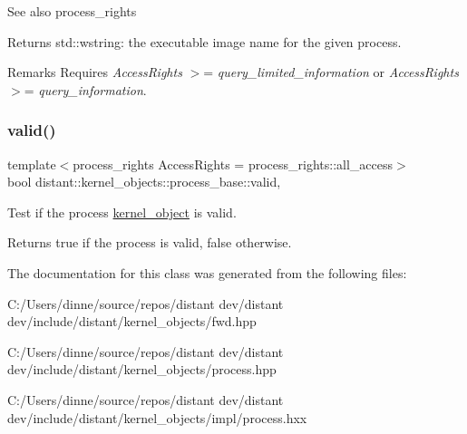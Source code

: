 \begin{DoxySeeAlso}{See also}
process\+\_\+rights 
\end{DoxySeeAlso}
\begin{DoxyReturn}{Returns}
std\+::wstring\+: the executable image name for the given process. 
\end{DoxyReturn}
\begin{DoxyRemark}{Remarks}
Requires {\itshape Access\+Rights} $>$= {\itshape query\+\_\+limited\+\_\+information} or {\itshape Access\+Rights} $>$= {\itshape query\+\_\+information}. 
\end{DoxyRemark}
\mbox{\label{classdistant_1_1kernel__objects_1_1process_a6299b49ad8fb1c22e54dc9aa6c3a09b2}} 
\subsubsection{\texorpdfstring{valid()}{valid()}}
{\footnotesize\ttfamily template$<$process\+\_\+rights Access\+Rights = process\+\_\+rights\+::all\+\_\+access$>$ \\
bool distant\+::kernel\+\_\+objects\+::process\+\_\+base\+::valid\hspace{0.3cm}{\ttfamily [inline]}, {\ttfamily [noexcept]}}



Test if the process \mbox{\hyperlink{classdistant_1_1kernel__objects_1_1kernel__object}{kernel\+\_\+object}} is valid. 

\begin{DoxyReturn}{Returns}
true if the process is valid, false otherwise. 
\end{DoxyReturn}


The documentation for this class was generated from the following files\+:\begin{DoxyCompactItemize}
\item 
C\+:/\+Users/dinne/source/repos/distant dev/distant dev/include/distant/kernel\+\_\+objects/fwd.\+hpp\item 
C\+:/\+Users/dinne/source/repos/distant dev/distant dev/include/distant/kernel\+\_\+objects/process.\+hpp\item 
C\+:/\+Users/dinne/source/repos/distant dev/distant dev/include/distant/kernel\+\_\+objects/impl/process.\+hxx\end{DoxyCompactItemize}
